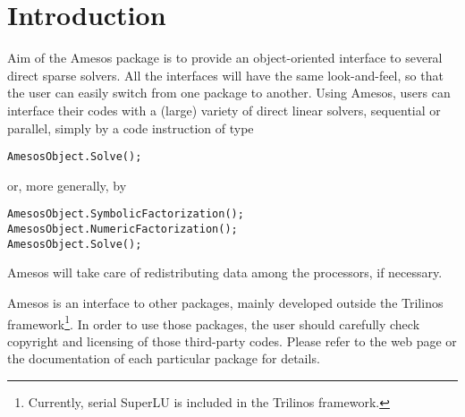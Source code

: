 \documentclass[11pt]{SANDreport}
\begin{document}
\smallskip


\smallskip


\smallskip


\clearpage

\section{Introduction}

Aim of the Amesos package is to provide an object-oriented interface to
several direct sparse solvers. All the interfaces will have the same
look-and-feel, so that the user can easily switch from one package to
another. Using Amesos, users can interface their codes with a (large)
variety of direct linear solvers, sequential or parallel, simply by a
code instruction of type
\begin{verbatim}
AmesosObject.Solve();
\end{verbatim}
or, more generally, by
\begin{verbatim}
AmesosObject.SymbolicFactorization();
AmesosObject.NumericFactorization();
AmesosObject.Solve();
\end{verbatim}
Amesos will take care of redistributing data among the
processors, if necessary.

Amesos is an interface to other packages, mainly developed outside the
Trilinos framework\footnote{Currently, serial SuperLU is included in the
  Trilinos framework.}. In order to use those packages, the user should
carefully check copyright and licensing of those third-party codes.
Please refer to the web page or the documentation of each particular
package for details.
\end{document}
